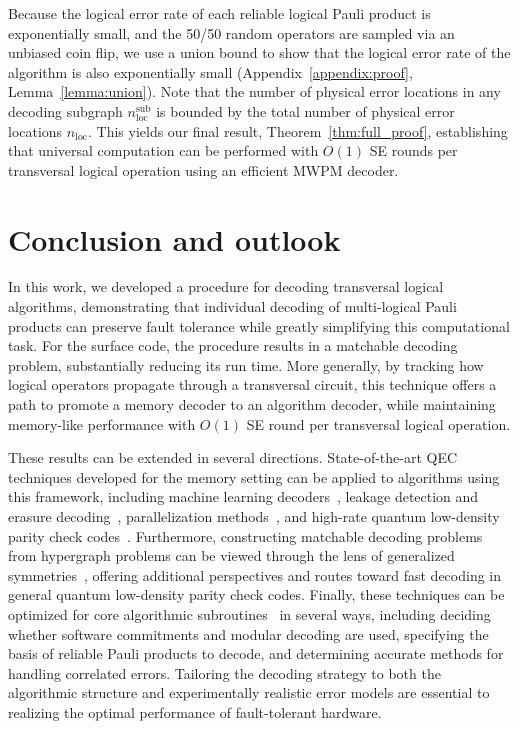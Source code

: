 \documentclass[prx,twocolumn,secnumarabic,balancelastpage,amsmath,amssymb,longbibliography]{revtex4-2}
\begin{document}
Because the logical error rate of each reliable logical Pauli product is exponentially small, and the 50/50 random operators are sampled via an unbiased coin flip, we use a union bound to show that the logical error rate of the algorithm is also exponentially small (Appendix~\ref{appendix:proof}, Lemma~\ref{lemma:union}). 
%
Note that the number of physical error locations in any decoding subgraph $n^{\mathrm{sub}}_{\mathrm{loc}}$ is bounded by the total number of physical error locations $n_{\mathrm{loc}}$.
%
This yields our final result, Theorem~\ref{thm:full_proof}, establishing that universal computation can be performed with $O(1)$ SE rounds per transversal logical operation using an efficient MWPM decoder.


\section{Conclusion and outlook}
In this work, we developed a procedure for decoding transversal logical algorithms, demonstrating that individual decoding of multi-logical Pauli products can preserve fault tolerance while greatly simplifying this computational task. 
%
For the surface code, the procedure results in a matchable decoding problem, substantially reducing its run time.
%
More generally, by tracking how logical operators propagate through a transversal circuit, this technique offers a path to promote a memory decoder to an algorithm decoder, while maintaining memory-like performance with $O(1)$ SE round per transversal logical operation.

These results can be extended in several directions. 
%
State-of-the-art QEC techniques developed for the memory setting can be applied to algorithms using this framework, including machine learning decoders~\cite{torlai2017neural, liu2019neural, varsamopoulos2020comparing, kuo2022comparison, bausch2023learning, cao2023qecgpt, maan2024machine, wang2023transformer, ninkovic2024decoding}, leakage detection and erasure decoding~\cite{wu2022erasure,kubica2023erasure,yu2024processing,chang2024surface,perrin2024quantum, baranes2025leveraging, gu2025fault}, parallelization methods~\cite{fowler2015minimum, wu2023fusion}, and high-rate quantum low-density parity check codes~\cite{breuckmann2021quantum,bravyi2024high,tillich2014quantum,xu2024constant}.
%
Furthermore, constructing matchable decoding problems from hypergraph problems can be viewed through the lens of generalized symmetries~\cite{kubica2023efficient, brown2022conservation}, offering additional perspectives and routes toward fast decoding in general quantum low-density parity check codes.
%
Finally, these techniques can be optimized for core algorithmic subroutines~\cite{cuccaro2004new,bravyi2005universal,babbush2018encoding, gidney2024magic} in several ways, including deciding whether software commitments and modular decoding are used, specifying the basis of reliable Pauli products to decode, and determining accurate methods for handling correlated errors.
%
Tailoring the decoding strategy to both the algorithmic structure and experimentally realistic error models are essential to realizing the optimal performance of fault-tolerant hardware.
\\
\end{document}
